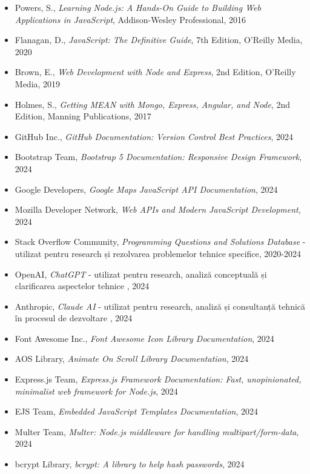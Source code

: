\documentclass[12pt,a4paper]{report}
\begin{document}
\begin{itemize}
    \item Powers, S., \textit{Learning Node.js: A Hands-On Guide to Building Web Applications in JavaScript}, Addison-Wesley Professional, 2016
    \item Flanagan, D., \textit{JavaScript: The Definitive Guide}, 7th Edition, O'Reilly Media, 2020
    \item Brown, E., \textit{Web Development with Node and Express}, 2nd Edition, O'Reilly Media, 2019
    \item Holmes, S., \textit{Getting MEAN with Mongo, Express, Angular, and Node}, 2nd Edition, Manning Publications, 2017
    \item GitHub Inc., \textit{GitHub Documentation: Version Control Best Practices}, 2024
    \item Bootstrap Team, \textit{Bootstrap 5 Documentation: Responsive Design Framework}, 2024
    \item Google Developers, \textit{Google Maps JavaScript API Documentation}, 2024
    \item Mozilla Developer Network, \textit{Web APIs and Modern JavaScript Development}, 2024
    \item Stack Overflow Community, \textit{Programming Questions and Solutions Database} - utilizat pentru research și rezolvarea problemelor tehnice specifice, 2020-2024
    \item OpenAI, \textit{ChatGPT} - utilizat pentru research, analiză conceptuală și clarificarea aspectelor tehnice , 2024
    \item Anthropic, \textit{Claude AI} - utilizat pentru research, analiză și consultanță tehnică în procesul de dezvoltare , 2024
    \item Font Awesome Inc., \textit{Font Awesome Icon Library Documentation}, 2024
    \item AOS Library, \textit{Animate On Scroll Library Documentation}, 2024
    \item Express.js Team, \textit{Express.js Framework Documentation: Fast, unopinionated, minimalist web framework for Node.js}, 2024
    \item EJS Team, \textit{Embedded JavaScript Templates Documentation}, 2024
    \item Multer Team, \textit{Multer: Node.js middleware for handling multipart/form-data}, 2024
    \item bcrypt Library, \textit{bcrypt: A library to help hash passwords}, 2024
\end{itemize}
\end{document}
